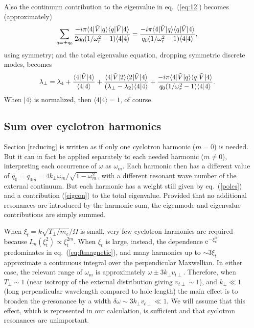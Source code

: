 \documentclass[12pt]{article}
\def\ket#1{|#1\rangle}
\def\bra#1{\langle#1}
\def\etothe#1{{\rm e}^{#1}}
\begin{document}
Also the continuum contribution to the eigenvalue in eq.\ (\ref{eq:12})
becomes (approximately)
\begin{equation}
  \label{eigcon}
\iffalse
  {-i\pi\bra{4}|\tilde V \ket{q_0}\bra{q_0}|\tilde{V}\ket{4}
    -\bra{4}|\tilde V \ket{-q_0}\bra{-q_0}|\tilde{V}\ket{4}
    \over
    2q_0(1/\omega_r^2-1)\bra{4}\ket{4}}=
\fi
  \sum_{q=\pm q_0} {-i\pi\bra{4}|\tilde V \ket{q}\bra{q}|\tilde{V}\ket{4}
    \over
    2q_0(1/\omega_r^2-1)\bra{4}\ket{4}}
  ={-i\pi\bra{4}|\tilde V \ket{q}\bra{q}|\tilde{V}\ket{4}
    \over
    q_0(1/\omega_r^2-1)\bra{4}\ket{4}},
\end{equation}
using symmetry; and the total eigenvalue equation, dropping symmetric discrete modes, becomes
\begin{equation}
  \label{eigtotal}
  \lambda_\perp=\lambda_4+{\bra{4}|\tilde{V}\ket{4}\over
    \bra{4}\ket{4}}
    +{\bra{4}|\tilde{V}\ket{2}\bra{2}|\tilde{V}\ket{4}\over
      (\lambda_\perp-\lambda_2)\bra{4}\ket{4}}
    +%
    {-i\pi\bra{4}|\tilde V \ket{q}\bra{q}|\tilde{V}\ket{4}
    \over
    q_0(1/\omega_r^2-1)\bra{4}\ket{4}}.
\end{equation}
When $\ket{4}$ is normalized, then $\bra{4}\ket{4}=1$, of course. 

\subsection{Sum over cyclotron harmonics}

Section \ref{reducing} is written as if only one cyclotron harmonic
($m=0$) is needed. But it can in fact be applied separately to each
needed harmonic ($m\not=0$), interpreting each occurrence of $\omega$
as $\omega_m$. Each harmonic then has a different value of
$q_0=q_{0m}=4k_\perp\omega_m/\sqrt{1-\omega_m^2}$, with a different
resonant wave number of the external continuum. But each harmonic has
a weight still given by eq.\ (\ref{poles}) and a contribution
(\ref{eigcon}) to the total eigenvalue. Provided that no additional
resonances are introduced by the harmonic sum, the eigenmode and
eigenvalue contributions are simply summed.

When $\xi_t=k\sqrt{T_\perp/m_e}/\Omega$ is small, very few cyclotron
harmonics are required because $I_m(\xi_t^2)\propto \xi_t^{2m}$. When
$\xi_t$ is large, instead, the dependence $\etothe{-\xi_t^2}$
predominates in eq.\ (\ref{eq:ftmagnetic}), and many harmonics up to
$\sim 3\xi_t$ approximate a continuous integral over the perpendicular
Maxwellian. In either case, the relevant range of $\omega_m$ is
approximately $\omega\pm 3k_\perp v_{t\perp}$. Therefore, when
$T_\perp \sim 1$ (near isotropy of the external distribution giving
$ v_{t\perp}\sim 1$), and $k_\perp\ll 1$ (long perpendicular wavelength
compared to hole length) the main effect is to broaden the
$q$-resonance by a width
$\delta \omega\sim3k_\perp v_{t\perp}\ll 1 $. We will assume
that this effect, which is represented in our calculation, is
sufficient and that cyclotron resonances are unimportant.
\end{document}
